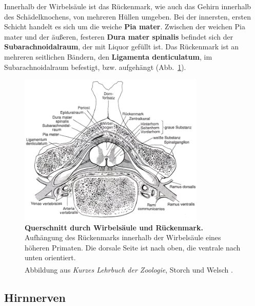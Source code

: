 \documentclass[12pt,a4paper,pdftex]{article}
\begin{document}
\noindent Innerhalb der Wirbelsäule ist das Rückenmark, wie auch das Gehirn innerhalb des Schädelknochens, von mehreren Hüllen umgeben. Bei der innersten, ersten Schicht handelt es sich um die weiche \textbf{Pia mater}. Zwischen der weichen Pia mater und der äußeren, festeren \textbf{Dura mater spinalis} befindet sich der \textbf{Subarachnoidalraum}, der mit Liquor gefüllt ist. Das Rückenmark ist an mehreren seitlichen Bändern, den \textbf{Ligamenta denticulatum}, im Subarachnoidalraum befestigt, bzw. aufgehängt (Abb.~\ref{fig:ruckenmark_wirbelsaeule}). 

\begin{figure}[H]
     \centering
     \includegraphics[width=0.79\textwidth]{pictures/Bilder_Jule/Andere/rueckenmark_wirbelsaeule.png}
     \caption[Querschnitt durch Wirbelsäule und Rückenmark]{\textbf{Querschnitt durch Wirbelsäule und Rückenmark.} Aufhängung des Rückenmarks innerhalb der Wirbelsäule eines höheren Primaten. Die dorsale Seite ist nach oben, die ventrale nach unten orientiert.\\
     Abbildung aus \textit{Kurzes Lehrbuch der Zoologie}, Storch und Welsch \textsuperscript{\cite[6]{storch2012lehrbuchzoo}}.}
     \label{fig:ruckenmark_wirbelsaeule}
\end{figure}


\subsection{Hirnnerven}
\label{subsec:Hirnnnerven}
\end{document}
